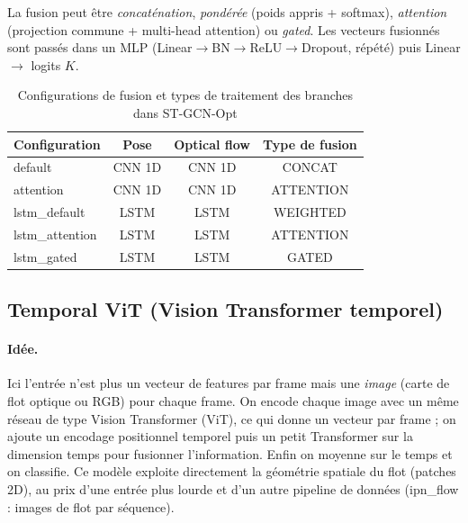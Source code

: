 \documentclass[11pt,a4paper]{article}
\begin{document}
La fusion peut être \emph{concaténation}, \emph{pondérée} (poids appris + softmax), \emph{attention} (projection commune + multi-head attention) ou \emph{gated}. Les vecteurs fusionnés sont passés dans un MLP (Linear$\to$BN$\to$ReLU$\to$Dropout, répété) puis Linear $\to$ logits $K$.

\begin{table}[htbp]
  \centering
  \caption{Configurations de fusion et types de traitement des branches dans ST-GCN-Opt}
  \label{tab:main}
  \begin{tabular}{lccc}
    \toprule
    Configuration  & Pose          & Optical flow   & Type de fusion \\
    \midrule
    default        & CNN 1D         & CNN 1D         & CONCAT         \\
    attention      & CNN 1D         & CNN 1D         & ATTENTION      \\
    lstm\_default  & LSTM           & LSTM           & WEIGHTED       \\
    lstm\_attention & LSTM           & LSTM           & ATTENTION      \\
    lstm\_gated    & LSTM           & LSTM           & GATED          \\
    \bottomrule
  \end{tabular}
\end{table}

\subsection{Temporal ViT (Vision Transformer temporel)}

\paragraph{Idée.} Ici l'entrée n'est plus un vecteur de features par frame mais une \emph{image} (carte de flot optique ou RGB) pour chaque frame. On encode chaque image avec un même réseau de type Vision Transformer (ViT), ce qui donne un vecteur par frame ; on ajoute un encodage positionnel temporel puis un petit Transformer sur la dimension temps pour fusionner l'information. Enfin on moyenne sur le temps et on classifie. Ce modèle exploite directement la géométrie spatiale du flot (patches 2D), au prix d'une entrée plus lourde et d'un autre pipeline de données (ipn\_flow : images de flot par séquence).
\end{document}
